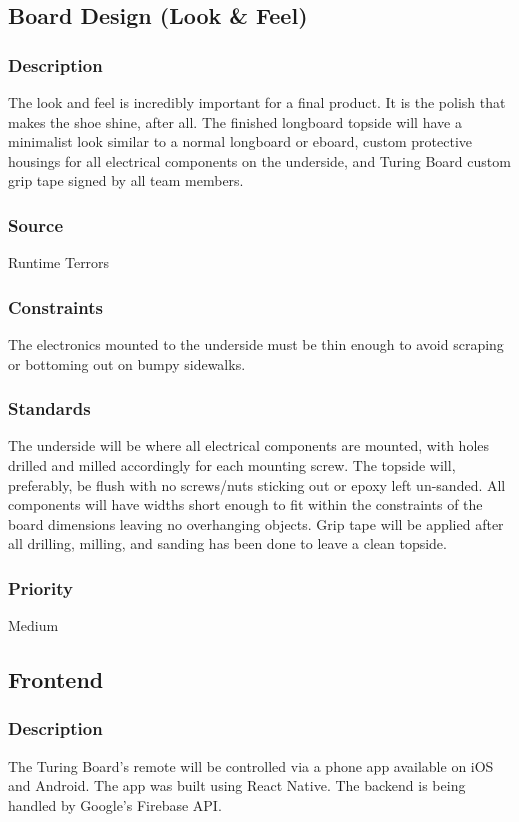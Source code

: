 \subsection{Board Design (Look \& Feel)}
\subsubsection{Description}
The look and feel is incredibly important for a final product. It is the polish that makes the shoe shine, after all. The finished longboard topside will have a minimalist look similar to a normal longboard or eboard, custom protective housings for all electrical components on the underside, and Turing Board custom grip tape signed by all team members.
\subsubsection{Source}
Runtime Terrors
\subsubsection{Constraints}
The electronics mounted to the underside must be thin enough to avoid scraping or bottoming out on bumpy sidewalks.
\subsubsection{Standards}
The underside will be where all electrical components are mounted, with holes drilled and milled accordingly for each mounting screw. The topside will, preferably, be flush with no screws/nuts sticking out or epoxy left un-sanded. All components will have widths short enough to fit within the constraints of the board dimensions leaving no overhanging objects. Grip tape will be applied after all drilling, milling, and sanding has been done to leave a clean topside.
\subsubsection{Priority}
Medium

\subsection{Frontend}
\subsubsection{Description}
The Turing Board's remote will be controlled via a phone app available on iOS and Android. The app was built using React Native. The backend is being handled by Google's Firebase API.

